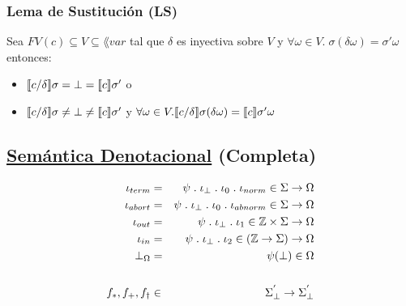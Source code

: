     \subsubsection*{Lema de Sustitución (LS)}
      \PN Sea $FV(c) \subseteq V \subseteq \lang{var}$ tal que $\delta$ es inyectiva sobre $V$ y $\forall \omega \in V . \; \sigma(\delta \omega) = \sigma' \omega$ entonces:
      \begin{itemize}
        \item $\llbracket c/\delta\rrbracket \sigma = \bot = \llbracket c\rrbracket \sigma'$ o
        \item $\llbracket c/\delta\rrbracket \sigma \neq \bot \neq \llbracket c\rrbracket \sigma'$ y $\forall \omega \in V . \llbracket c/\delta\rrbracket \sigma (\delta \omega) = \llbracket c\rrbracket \sigma' \omega$
      \end{itemize}

    \pagebreak
    \subsection*{\underline{Semántica Denotacional} (Completa)}
      \begin{eqnarray*}
        \iota_{term} &=& \psi \; . \; \iota_{\bot} \; . \; \iota_0 \; . \; \iota_{norm} \in \Sigma \rightarrow \Omega \\
        \iota_{abort} &=& \psi \; . \; \iota_{\bot} \; . \; \iota_0 \; . \; \iota_{abnorm} \in \Sigma \rightarrow \Omega \\
        \iota_{out} &=& \psi \; . \; \iota_{\bot} \; . \; \iota_1 \in \mathbb{Z} \times \Sigma \rightarrow \Omega \\
        \iota_{in} &=& \psi \; . \; \iota_{\bot} \; . \; \iota_2 \in (\mathbb{Z} \rightarrow \Sigma) \rightarrow \Omega \\
        \bot_{\Omega} &=& \psi(\bot) \in \Omega \\ \\
        f_{\ast}, f_{+}, f_{\dag} &\in& \Sigma^{'}_{\bot} \rightarrow \Sigma^{'}_{\bot}
      \end{eqnarray*}

